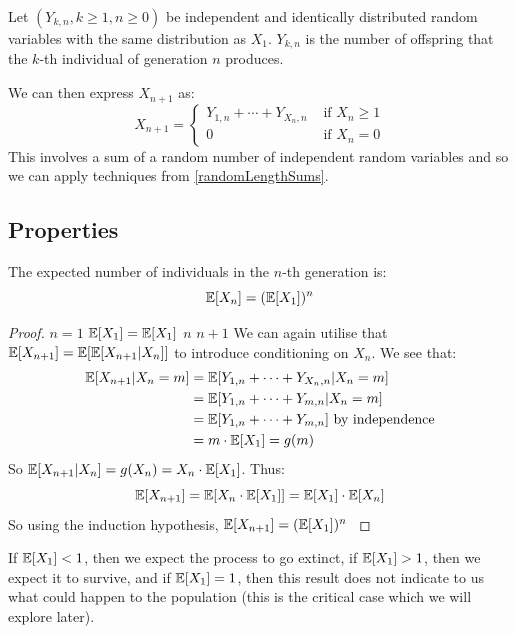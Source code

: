 \documentclass[../main.tex]{subfiles}
\begin{document}
Let $(Y_{k, n}, k \geq 1, n \geq 0)$ be independent and identically distributed random variables with the same distribution as $X_1$.
$Y_{k, n}$ is the number of offspring that the $k$-th individual of generation $n$ produces.

We can then express $X_{n + 1}$ as:
\[
  X_{n + 1} = \begin{cases}
  Y_{1, n} + \cdots + Y_{X_n, n} & \text{ if } X_n \geq 1 \\
  0 & \text{ if } X_n = 0
  \end{cases}
\]
This involves a sum of a random number of independent random variables and so we can apply techniques from \cref{randomLengthSums}.
\subsection{Properties}
\begin{theorem}
  The expected  number of individuals in the $n$-th generation is:
  \label{expectationBranching}
  \[
    \mathbb{E}[X_n] = (\mathbb{E}[X_1])^{n}
  \]
\end{theorem}
\begin{proof}
  \induction
  {$n = 1$}{
    $\mathbb{E}[X_1] = \mathbb{E}[X_1]$ \tick
  }
  {$n$}{}
  {$n + 1$}{
    We can again utilise that $\mathbb{E}[X_{n + 1}] = \mathbb{E}[\mathbb{E}[X_{n + 1} \vert X_n]]$ to introduce conditioning on $X_n$.
    We see that:
    \begin{align*}
      \mathbb{E}[X_{n + 1} \vert X_n = m] &= \mathbb{E}[Y_{1, n} + \cdots + Y_{X_n, n} \vert X_n = m] \\
                                  &= \mathbb{E}[Y_{1, n} + \cdots + Y_{m, n} \vert X_n = m] \\
                                  &= \mathbb{E}[Y_{1, n} + \cdots + Y_{m, n}] \text{ by independence} \\
                                  &= m \cdot \mathbb{E}[X_1] = g(m)
    \end{align*}
    So $\mathbb{E}[X_{n + 1} \vert X_n] = g(X_n) = X_n \cdot \mathbb{E}[X_1]$.
    Thus:
    \[
      \mathbb{E}[X_{n + 1}] = \mathbb{E}[X_n \cdot \mathbb{E}[X_1]] = \mathbb{E}[X_1] \cdot \mathbb{E}[X_n]
    \]
    So using the induction hypothesis, $\mathbb{E}[X_{n + 1}] = (\mathbb{E}[X_1])^{n}$
  }
\end{proof}
\begin{remark}
  If $\mathbb{E}[X_1] < 1$, then we expect the process to go extinct, if $\mathbb{E}[X_1] > 1$, then we expect it to survive, and if $\mathbb{E}[X_1] = 1$, then this result does not indicate to us what could happen to the population (this is the critical case which we will explore later).
\end{remark}
\end{document}
